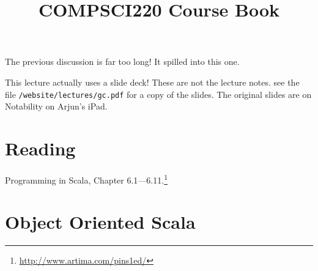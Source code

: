 \documentclass[9pt]{extbook}
\title{COMPSCI220 Course Book}
\begin{document}
\maketitle
\tableofcontents


















The previous discussion is far too long! It spilled into this one.



\newlecture

This lecture actually uses a slide deck! These are not the lecture notes.
see the file \texttt{/website/lectures/gc.pdf} for a copy of the slides.
The original slides are on Notability on Arjun's iPad.



\newlecture

\section{Reading}

Programming in Scala, Chapter 6.1---6.11.\footnote{\url{http://www.artima.com/pins1ed/}}

\section{Object Oriented Scala}
\end{document}

